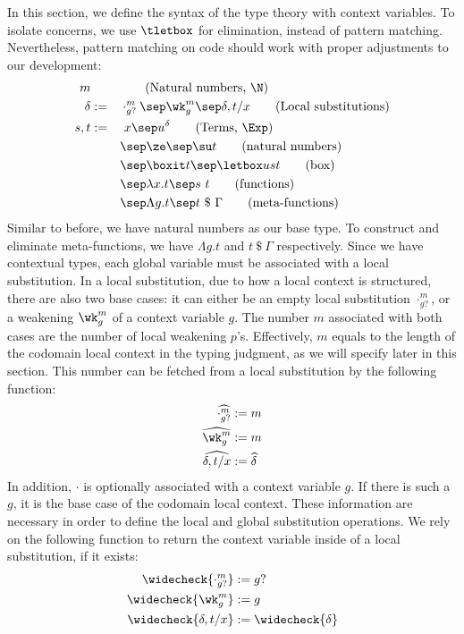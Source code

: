In this section, we define the syntax of the type theory with context variables. %
To isolate concerns, we use $\tletbox$ for elimination, instead of pattern matching. %
Nevertheless, pattern matching on code should work with proper adjustments to our
development:
\begin{alignat*}{2}
  m & && \tag{Natural numbers, $\N$} \\
  \delta &:=&& \cdot_{g?}^{m} \sep \wk_g^m \sep \delta, t/x \tag{Local substitutions} \\
  s, t &:=&&\ x \sep u^\delta \tag{Terms, $\Exp$} \\
  & && \sep \ze \sep \su t
  \tag{natural numbers}\\
  & && \sep \boxit t \sep \letbox u s t
  \tag{box}\\
  & &&\sep \lambda x. t \sep s\ t \tag{functions}  \\
  & &&\sep \Lambda g. t \sep t ~\$~ \Gamma \tag{meta-functions} 
\end{alignat*}
Similar to before, we have natural numbers as our base type. %
To construct and eliminate meta-functions, we have $\Lambda g. t$ and $t ~\$~ \Gamma$
respectively. %
Since we have contextual types, each global variable must be associated with a local
substitution. %
In a local substitution, due to how a local context is structured, there are also two
base cases: it can either be an empty local substitution $\cdot_{g?}^{m}$, or a weakening $\wk^m_g$ of a
context variable $g$. %
The number $m$ associated with both cases are the number of local weakening $p$'s. %
Effectively, $m$ equals to the length of the codomain local context in the typing
judgment, as we will specify later in this section. %
This number can be fetched from a local substitution by the following function:
\begin{align*}
  \widehat{\cdot_{g?}^m} &:= m \\
  \widehat{\wk_{g}^m} &:= m \\
  \widehat{\delta, t/x} &:= \widehat{\delta}
\end{align*}
In addition, $\cdot$ is optionally associated with a context variable $g$. %
If there is such a $g$, it is the base case of the codomain local context. %
These information are necessary in order to define the local and global substitution
operations. %
We rely on the following function to return the context variable inside of a local
substitution, if it exists:
\begin{align*}
  \widecheck{\cdot_{g?}^m} &:= g? \\
  \widecheck{\wk_g^m} &:= g \\
  \widecheck{\delta, t/x} &:= \widecheck{\delta}
\end{align*}
